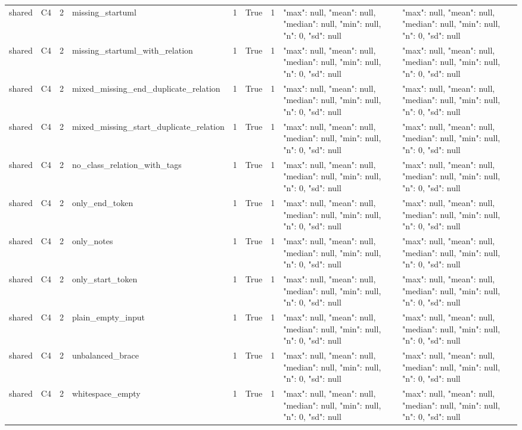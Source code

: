 \begin{tabular}{lllllllll}
shared & C4 & 2 & missing\_startuml & 1 & True & 1 & {"max": null, "mean": null, "median": null, "min": null, "n": 0, "sd": null} & {"max": null, "mean": null, "median": null, "min": null, "n": 0, "sd": null} \\
shared & C4 & 2 & missing\_startuml\_with\_relation & 1 & True & 1 & {"max": null, "mean": null, "median": null, "min": null, "n": 0, "sd": null} & {"max": null, "mean": null, "median": null, "min": null, "n": 0, "sd": null} \\
shared & C4 & 2 & mixed\_missing\_end\_duplicate\_relation & 1 & True & 1 & {"max": null, "mean": null, "median": null, "min": null, "n": 0, "sd": null} & {"max": null, "mean": null, "median": null, "min": null, "n": 0, "sd": null} \\
shared & C4 & 2 & mixed\_missing\_start\_duplicate\_relation & 1 & True & 1 & {"max": null, "mean": null, "median": null, "min": null, "n": 0, "sd": null} & {"max": null, "mean": null, "median": null, "min": null, "n": 0, "sd": null} \\
shared & C4 & 2 & no\_class\_relation\_with\_tags & 1 & True & 1 & {"max": null, "mean": null, "median": null, "min": null, "n": 0, "sd": null} & {"max": null, "mean": null, "median": null, "min": null, "n": 0, "sd": null} \\
shared & C4 & 2 & only\_end\_token & 1 & True & 1 & {"max": null, "mean": null, "median": null, "min": null, "n": 0, "sd": null} & {"max": null, "mean": null, "median": null, "min": null, "n": 0, "sd": null} \\
shared & C4 & 2 & only\_notes & 1 & True & 1 & {"max": null, "mean": null, "median": null, "min": null, "n": 0, "sd": null} & {"max": null, "mean": null, "median": null, "min": null, "n": 0, "sd": null} \\
shared & C4 & 2 & only\_start\_token & 1 & True & 1 & {"max": null, "mean": null, "median": null, "min": null, "n": 0, "sd": null} & {"max": null, "mean": null, "median": null, "min": null, "n": 0, "sd": null} \\
shared & C4 & 2 & plain\_empty\_input & 1 & True & 1 & {"max": null, "mean": null, "median": null, "min": null, "n": 0, "sd": null} & {"max": null, "mean": null, "median": null, "min": null, "n": 0, "sd": null} \\
shared & C4 & 2 & unbalanced\_brace & 1 & True & 1 & {"max": null, "mean": null, "median": null, "min": null, "n": 0, "sd": null} & {"max": null, "mean": null, "median": null, "min": null, "n": 0, "sd": null} \\
shared & C4 & 2 & whitespace\_empty & 1 & True & 1 & {"max": null, "mean": null, "median": null, "min": null, "n": 0, "sd": null} & {"max": null, "mean": null, "median": null, "min": null, "n": 0, "sd": null} \\

\end{tabular}
